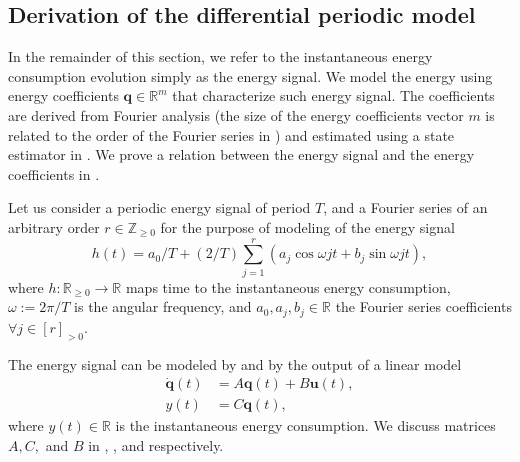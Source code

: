 \subsection{Derivation of the differential periodic model}
\label{sec:deriv}

In the remainder of this section, we refer to the instantaneous energy consumption evolution simply as the energy signal. We model the energy using energy coefficients $\mathbf{q}\in\mathbb{R}^m$ that characterize such energy signal. The coefficients are derived from Fourier analysis (the size of the energy coefficients vector $m$ is related to the order of the Fourier series in ) and estimated using a state estimator in . We prove a relation between the energy signal and the energy coefficients in . %

Let us consider a periodic energy signal of period $T$, and a Fourier series of an arbitrary order $r\in\mathbb{Z}_{\geq 0}$ for the purpose of modeling of the energy signal
\begin{equation}\label{eq:fourier}
  h(t)=a_0/T+(2/T)\sum_{j=1}^{r}{\left(a_j\cos{\omega jt}+b_j\sin{\omega jt}\right)},
\end{equation}
where $h:\mathbb{R}_{\geq 0}\rightarrow\mathbb{R}$ maps time to the instantaneous energy consumption, $\omega:=2\pi/T$ is the angular frequency, and $a_0,a_j,b_j\in\mathbb{R}$ the Fourier series coefficients $\forall j\in[r]_{>0}$.

The energy signal can be modeled by  and by the output of a linear model
\begin{subequations}\label{eq:state-perf}\begin{align}
  \dot{\mathbf{q}}(t)&=A\mathbf{q}(t)+B\mathbf{u}(t),\\
  y(t)&=C\mathbf{q}(t),
\end{align}\end{subequations}
where $y(t)\in\mathbb{R}$ is the instantaneous energy consumption. We discuss matrices $A,C,$ and $B$ in , , and  respectively.

